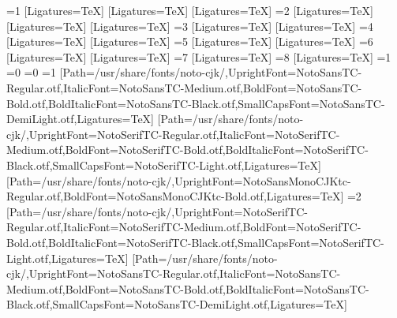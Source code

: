 \usepackage[version=4]{mhchem}
\usepackage[hidelinks,bookmarksnumbered=true,pdfstartview=FitH]{hyperref}
\usepackage{tcolorbox}
\usepackage{unicode-math}
\ifnum\value{Fonts}=1
\setmainfont{TeX Gyre Heros}[Ligatures=TeX]
\setsansfont{TeX Gyre Termes}[Ligatures=TeX]
\setmonofont{TeX Gyre Cursor}[Ligatures=TeX]
\else\ifnum\value{Fonts}=2
\setmainfont{TeX Gyre Termes}[Ligatures=TeX]
\setsansfont{TeX Gyre Heros}[Ligatures=TeX]
\setmonofont{TeX Gyre Cursor}[Ligatures=TeX]
\else\ifnum\value{Fonts}=3
\setmainfont{TeX Gyre Heros}[Ligatures=TeX]
\setmonofont{TeX Gyre Cursor}[Ligatures=TeX]
\else\ifnum\value{Fonts}=4
\setmainfont{TeX Gyre Termes}[Ligatures=TeX]
\setmonofont{TeX Gyre Cursor}[Ligatures=TeX]
\else\ifnum\value{Fonts}=5
\setmainfont{TeX Gyre Heros}[Ligatures=TeX]
\setsansfont{TeX Gyre Termes}[Ligatures=TeX]
\else\ifnum\value{Fonts}=6
\setmainfont{TeX Gyre Termes}[Ligatures=TeX]
\setsansfont{TeX Gyre Heros}[Ligatures=TeX]
\else\ifnum\value{Fonts}=7
\setmainfont{TeX Gyre Heros}[Ligatures=TeX]
\else\ifnum\value{Fonts}=8
\setmainfont{TeX Gyre Termes}[Ligatures=TeX]
\fi\fi\fi\fi\fi\fi\fi\fi
\ifnum\value{CJK}=1
\if\xluatexversion\undefined
\ifnum\value{CJKFonts}=0\else
\ifnum\value{CJKLanguage}=0
\ifnum\value{CJKFonts}=1
[Path=/usr/share/fonts/noto-cjk/,UprightFont=NotoSansTC-Regular.otf,ItalicFont=NotoSansTC-Medium.otf,BoldFont=NotoSansTC-Bold.otf,BoldItalicFont=NotoSansTC-Black.otf,SmallCapsFont=NotoSansTC-DemiLight.otf,Ligatures=TeX]
[Path=/usr/share/fonts/noto-cjk/,UprightFont=NotoSerifTC-Regular.otf,ItalicFont=NotoSerifTC-Medium.otf,BoldFont=NotoSerifTC-Bold.otf,BoldItalicFont=NotoSerifTC-Black.otf,SmallCapsFont=NotoSerifTC-Light.otf,Ligatures=TeX]
[Path=/usr/share/fonts/noto-cjk/,UprightFont=NotoSansMonoCJKtc-Regular.otf,BoldFont=NotoSansMonoCJKtc-Bold.otf,Ligatures=TeX]
\else\ifnum\value{CJKFonts}=2
[Path=/usr/share/fonts/noto-cjk/,UprightFont=NotoSerifTC-Regular.otf,ItalicFont=NotoSerifTC-Medium.otf,BoldFont=NotoSerifTC-Bold.otf,BoldItalicFont=NotoSerifTC-Black.otf,SmallCapsFont=NotoSerifTC-Light.otf,Ligatures=TeX]
[Path=/usr/share/fonts/noto-cjk/,UprightFont=NotoSansTC-Regular.otf,ItalicFont=NotoSansTC-Medium.otf,BoldFont=NotoSansTC-Bold.otf,BoldItalicFont=NotoSansTC-Black.otf,SmallCapsFont=NotoSansTC-DemiLight.otf,Ligatures=TeX]
